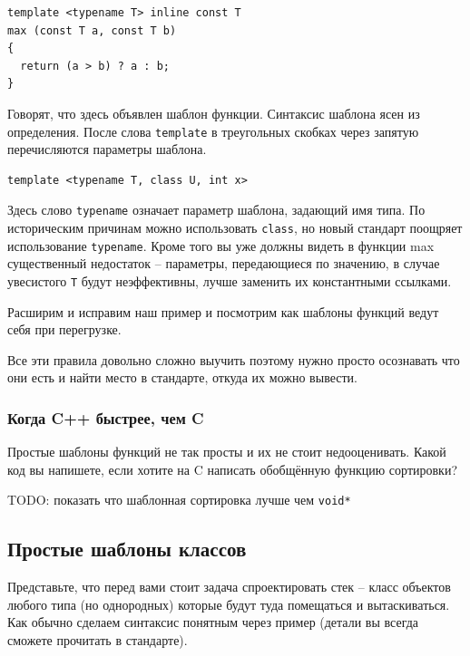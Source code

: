 \documentclass[a4paper,12pt,oneside]{article}
\begin{document}
\begin{lstlisting}
template <typename T> inline const T 
max (const T a, const T b)
{
  return (a > b) ? a : b;
} 
\end{lstlisting}

Говорят, что здесь объявлен шаблон функции. Синтаксис шаблона ясен из определения. После слова \lstinline!template! в треугольных скобках через запятую перечисляются параметры шаблона.

\begin{lstlisting}
template <typename T, class U, int x>
\end{lstlisting}

Здесь слово \lstinline!typename! означает параметр шаблона, задающий имя типа. По историческим причинам можно использовать \lstinline!class!, но новый стандарт поощряет использование \lstinline!typename!. Кроме того вы уже должны видеть в функции max существенный недостаток – параметры, передающиеся по значению, в случае увесистого \lstinline!T! будут неэффективны, лучше заменить их константными ссылками.

Расширим и исправим наш пример и посмотрим как шаблоны функций ведут себя при перегрузке.



Все эти правила довольно сложно выучить поэтому нужно просто осознавать что они есть и найти место в стандарте, откуда их можно вывести.

\subsubsection{Когда C++ быстрее, чем C}\label{CppBetterC}

Простые шаблоны функций не так просты и их не стоит недооценивать. Какой код вы напишете, если хотите на C написать обобщённую функцию сортировки?

TODO: показать что шаблонная сортировка лучше чем \lstinline!void*!

\subsection{Простые шаблоны классов}

Представьте, что перед вами стоит задача спроектировать стек – класс объектов любого типа (но однородных) которые будут туда помещаться и вытаскиваться. Как обычно сделаем синтаксис понятным через пример (детали вы всегда сможете прочитать в стандарте).
\end{document}
